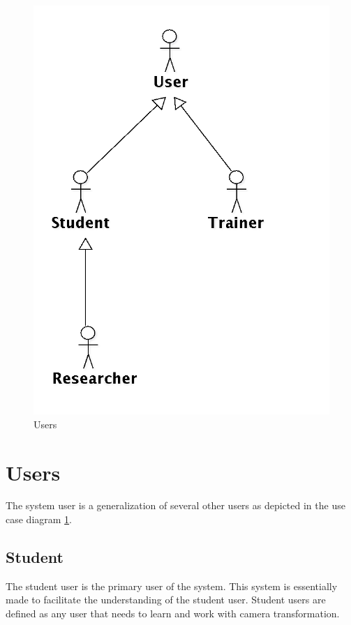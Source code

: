 \documentclass[11pt]{report}
\begin{document}
\begin{figure}[htp]
\centering
\includegraphics[scale=0.25]{images/UserOverview.png}
\caption{Users}
\label{fig:uo}
\end{figure}

\section{Users} 

The system user is a generalization of several other users as depicted in the use case diagram \ref{fig:uo}.  

\subsection{Student}

The student user is the primary user of the system. This system is essentially made to facilitate the understanding of the student user. Student users are defined as any user that needs to learn and work with camera transformation.  
\end{document}

